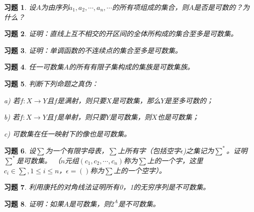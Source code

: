 \documentclass{article}
\begin{document}
\begin{CJK}{UTF8}{gbsn}
\newtheorem{Exercise}{习题}
\begin{Exercise}
设$A$为由序列$a_1,a_2,\cdots,a_n,\cdots$的所有项组成的集合，则$A$是否是可数的？为什么？
\end{Exercise}
\vspace{3cm}
\begin{Exercise}
  证明：直线上互不相交的开区间的全体所构成的集合至多是可数集。
\end{Exercise}
\vspace{3cm}
\begin{Exercise}
  证明：单调函数的不连续点的集合至多是可数集。
\end{Exercise}
\vspace{12cm}
\begin{Exercise}
  任一可数集$A$的所有有限子集构成的集族是可数集族。
\end{Exercise}
\vspace{10cm}
\begin{Exercise}
  判断下列命题之真伪：

 a) 若$f:X\to Y$且$f$是满射，则只要$X$是可数集，那么$Y$是至多可数的；

 b) 若$f:X\to Y$且$f$是单射，则只要$Y$是可数集，则$X$也是可数集；

 c) 可数集在任一映射下的像也是可数集。
\end{Exercise}
\vspace{10cm}
\begin{Exercise}
  设$\sum$为一个有限字母表，$\sum$上所有字（包括空字$\epsilon$)之集记为$\sum^*$。证明$\sum^*$是可数集。
  （$n$元组$(c_1,c_2,\cdots,c_n)$称为$\sum$上的一个字，这里$c_i\in \sum, 1\leq i\leq n$，$\epsilon=()$称为$\sum$上的一个空字）。
\end{Exercise}
\vspace{10cm}
\begin{Exercise}
  利用康托的对角线法证明所有0，1的无穷序列是不可数集。
\end{Exercise}
\vspace{5cm}
\begin{Exercise}
  证明：如果$A$是可数集，则$2^A$是不可数集。
\end{Exercise}
\end{CJK}
\end{document}
